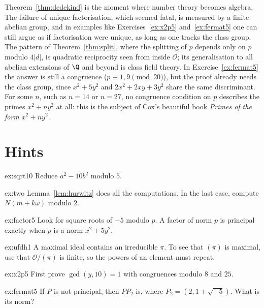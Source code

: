 \begin{beauty}
Theorem~\ref{thm:dedekind} is the moment where number theory becomes algebra. The failure of unique factorisation, which seemed fatal, is measured by a finite abelian group, and in examples like Exercises~\ref{ex:x2p5} and~\ref{ex:fermat5} one can still argue as if factorisation were unique, as long as one tracks the class group. The pattern of Theorem~\ref{thm:split}, where the splitting of $p$ depends only on $p$ modulo $4|d|$, is quadratic reciprocity seen from inside $\mathcal O$; its generalisation to all abelian extensions of $\Q$ and beyond is class field theory. In Exercise~\ref{ex:fermat5} the answer is still a congruence ($p\equiv1,9\pmod{20}$), but the proof already needs the class group, since $x^2+5y^2$ and $2x^2+2xy+3y^2$ share the same discriminant. For some $n$, such as $n=14$ or $n=27$, no congruence condition on $p$ describes the primes $x^2+ny^2$ at all: this is the subject of Cox's beautiful book \emph{Primes of the form $x^2+ny^2$}.
\end{beauty}

\section{Hints}

\begin{hint}{ex:sqrt10}
Reduce $a^2-10b^2$ modulo $5$.
\end{hint}

\begin{hint}{ex:two}
Lemma~\ref{lem:hurwitz} does all the computations. In the last case, compute $N(m+k\omega)$ modulo $2$.
\end{hint}

\begin{hint}{ex:factor5}
Look for square roots of $-5$ modulo $p$. A factor of norm $p$ is principal exactly when $p$ is a norm $x^2+5y^2$.
\end{hint}

\begin{hint}{ex:ufdh1}
A maximal ideal contains an irreducible $\pi$. To see that $(\pi)$ is maximal, use that $\mathcal O/(\pi)$ is finite, so the powers of an element must repeat.
\end{hint}

\begin{hint}{ex:x2p5}
First prove $\gcd(y,10)=1$ with congruences modulo $8$ and $25$.
\end{hint}

\begin{hint}{ex:fermat5}
If $P$ is not principal, then $PP_2$ is, where $P_2=(2,1+\sqrt{-5})$. What is its norm?
\end{hint}

